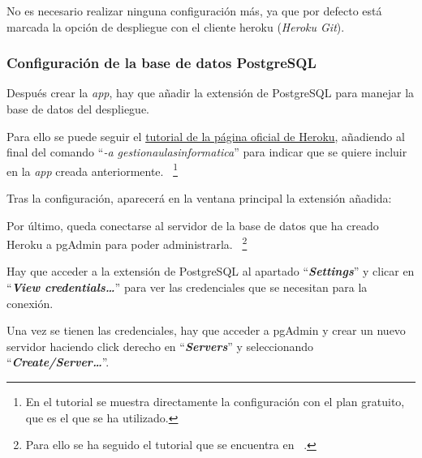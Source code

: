 
No es necesario realizar ninguna configuración más, ya que por defecto está marcada la opción de despliegue con el cliente heroku (\textit{Heroku Git}).


\subsubsection{Configuración de la base de datos PostgreSQL}
Después crear la \textit{app}, hay que añadir la extensión de PostgreSQL para manejar la base de datos del despliegue. 

Para ello se puede seguir el \href{https://devcenter.heroku.com/articles/heroku-postgresql#provisioning-heroku-postgres}{tutorial de la página oficial de Heroku}, añadiendo al final del comando ``\textit{-a gestionaulasinformatica}'' para indicar que se quiere incluir en la \textit{app} creada anteriormente. ~\footnote{En el tutorial se muestra directamente la configuración con el plan gratuito, que es el que se ha utilizado.}

Tras la configuración, aparecerá en la ventana principal la extensión añadida:


Por último, queda conectarse al servidor de la base de datos que ha creado Heroku a pgAdmin para poder administrarla. ~\footnote{Para ello se ha seguido el tutorial que se encuentra en ~\cite{importar_bd_postgresql_heroku}.}

Hay que acceder a la extensión de PostgreSQL al apartado ``\textbf{\textit{Settings}}'' y clicar en ``\textbf{\textit{View credentials\dots}}'' para ver las credenciales que se necesitan para la conexión.



Una vez se tienen las credenciales, hay que acceder a pgAdmin y crear un nuevo servidor haciendo click derecho en ``\textbf{\textit{Servers}}'' y seleccionando ``\textbf{\textit{Create/Server\dots{}}}''.

